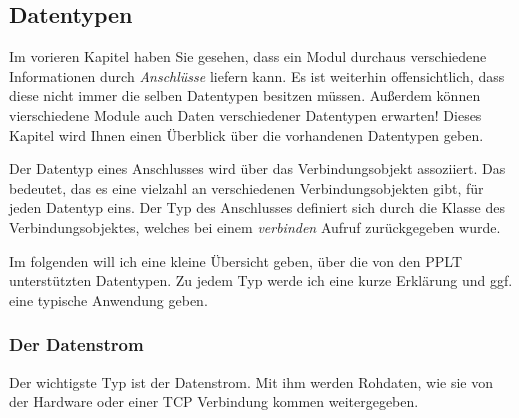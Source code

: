 \documentclass[a4paper,10pt]{book}
\begin{document}
    \subsection{Datentypen}
    \label{sec:th_datentypen}
    Im vorieren Kapitel haben Sie gesehen, dass ein Modul durchaus 
    verschiedene Informationen durch \emph{Anschlüsse} liefern kann.
    Es ist weiterhin offensichtlich, dass diese nicht immer die selben
    Datentypen besitzen müssen. Außerdem können vierschiedene Module
    auch Daten verschiedener Datentypen erwarten! Dieses Kapitel wird
    Ihnen einen Überblick über die vorhandenen Datentypen geben.
    
    Der Datentyp eines Anschlusses wird über das Verbindungsobjekt
    assoziiert. Das bedeutet, das es eine vielzahl an verschiedenen
    Verbindungsobjekten gibt, für jeden Datentyp eins. Der Typ
    des Anschlusses definiert sich durch die Klasse des Verbindungsobjektes,
    welches bei einem \emph{verbinden} Aufruf zurückgegeben wurde.
    
    Im folgenden will ich eine kleine Übersicht geben, über die von den PPLT
    unterstützten Datentypen. Zu jedem Typ werde ich eine kurze Erklärung und
    ggf. eine typische Anwendung geben.
    
    \subsubsection{Der Datenstrom}
    Der wichtigste Typ ist der Datenstrom. Mit ihm werden Rohdaten,
    wie sie von der Hardware oder einer TCP Verbindung kommen 
    weitergegeben.  
    
\end{document}
